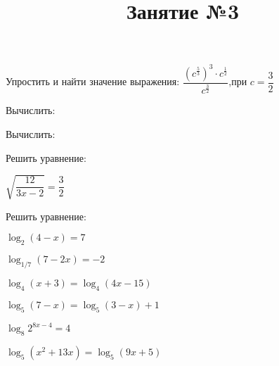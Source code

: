 \newpage
\title{Занятие №3}
\begin{listofex}
	\item {}
	\item Упростить и найти значение выражения: \( \dfrac{\left( c^{\frac{5}{3}} \right)^3\cdot c^{\frac{1}{2}}}{c^{\frac{3}{2}}} \),\quad при \( c=\dfrac{3}{2} \) 
	\item Вычислить:
	\begin{enumcols}[itemcolumns=2]
		\item {}
		\item {}
		\item {}
		\item {}
		\item {}
		\item {}
	\end{enumcols}
	\item Вычислить:
	\begin{enumcols}[itemcolumns=3]
		\item {}
		\item {}
		\item {}
	\end{enumcols}
	\item Решить уравнение:
	\begin{enumcols}[itemcolumns=2]
		\item {}
		\item {}
		\item \( \sqrt{\dfrac{12}{3x-2}}=\dfrac{3}{2} \)
		\item {}
	\end{enumcols}
	\item Решить уравнение:
	\begin{enumcols}[itemcolumns=2]
		\item \( \log_2(4-x)=7 \) 
		\item \( \log_{1/7}(7-2x)=-2 \) 
		\item \( \log_4(x+3)=\log_4(4x-15) \) 
		\item \( \log_5(7-x)=\log_5(3-x)+1 \) 
		\item \( \log_8 2^{8x-4}=4 \) 
		\item \( \log_5(x^2+13x)=\log_5(9x+5) \) 
	\end{enumcols}
\end{listofex}
